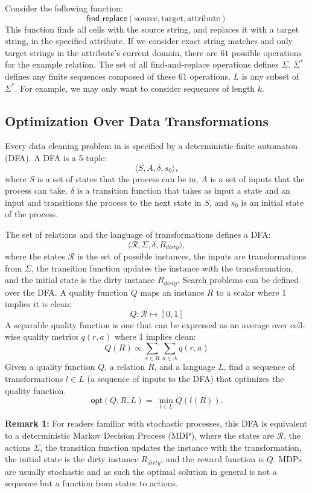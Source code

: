 \noindent Consider the following function:
\[
\textsf{find\_replace}(\text{source}, \text{target}, \text{attribute})
\]
This function finds all cells with the source string, and replaces it with a target string, in the specified attribute.
If we consider exact string matches and only target strings in the attribute's current domain, there are $61$ possible operations for the example relation.
The set of all find-and-replace operations defines $\Sigma$.
$\Sigma^*$ defines any finite sequences composed of these $61$ operations.
$L$ is any subset of $\Sigma^*$. 
For example, we may only want to consider sequences of length $k$.


\subsection{Optimization Over Data Transformations}
Every data cleaning problem in \sys is specified by a deterministic finite automaton (DFA). 
A DFA is a 5-tuple:
\[\langle S, A, \delta, s_0\rangle,\]
where $S$ is a set of states that the process can be in, $A$ is a set of inputs that the process can take, $\delta$ is a transition function that takes as input a state and an input and transitions the process to the next state in $S$, and $s_0$ is an initial state of the process.

The set of relations and the language of transformations defines a DFA:
\[\langle \mathcal{R}, \Sigma, \delta, R_{dirty}\rangle, \]
where the states $\mathcal{R}$ is the set of possible instances, the inputs are transformations from $\Sigma$, the transition function updates the instance with the transformation, and the initial state is the dirty instance $R_{dirty}$. Search problems can be defined over the DFA. 
A quality function $Q$ maps an instance $R$ to a scalar where 1 implies it is clean:
\[
Q: \mathcal{R} \mapsto [0,1]
\]
A separable quality function is one that can be expressed as an average over cell-wise quality metrics $q(r,a)$ where 1 implies clean:
\[
Q(R) \propto \sum_{r \in R} \sum_{a \in A} q(r,a)
\]
Given a quality function $Q$, a relation $R$, and a language $L$, find a sequence of transformations $l \in L$ (a sequence of inputs to the DFA) that optimizes the quality function.
\[
\textsf{opt}(Q,R,L) = ~ \min_{l \in L} Q( l(R) ).  
\]

\vspace{0.5em} \noindent \textbf{Remark 1: } For readers familiar with stochastic processes, this DFA is equivalent to a deterministic Markov Decision Process (MDP), where the states are $\mathcal{R}$, the actions $\Sigma$, the transition function updates the instance with the transformation, the initial state is the dirty instance $R_{dirty}$, and the reward function is $Q$. MDPs are usually stochastic and as such the optimal solution in general is not a sequence but a function from states to actions.


